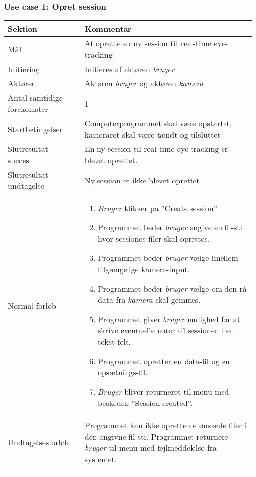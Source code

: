 \documentclass[kravspec.tex]{subfiles}
\begin{document}
		\subsubsection{Use case 1: Opret session}
		\begin{tabular}{|l|p{7.7cm}|}
			\hline \textbf{Sektion} & \textbf{Kommentar} \\ 
			\hline Mål & At oprette en ny session til real-time eye-tracking \\ 
			\hline Initiering & Initieres af aktøren \textit{bruger} \\ 
			\hline Aktører & Aktøren \textit{bruger} og aktøren \textit{kamera}\\ 
			\hline Antal samtidige forekomster & 1 \\ 
			\hline Startbetingelser & Computerprogrammet skal være opstartet, kameraret skal være tændt og tilsluttet \\ 	
			\hline Slutresultat - succes & En ny session til real-time eye-tracking er blevet oprettet. \\ 
			\hline Slutresultat - undtagelse &  Ny session er ikke blevet oprettet. \\ 
			\hline Normal forløb & \begin{enumerate}
				\item \textit{Bruger} klikker på ”Create session”
				\item Programmet beder \textit{bruger} angive en fil-sti hvor sessiones filer skal oprettes.
				\item Programmet beder \textit{bruger} vælge imellem tilgængelige kamera-input.
				\item Programmet beder \textit{bruger} vælge om den rå data fra \textit{kamera} skal gemmes.
				
				
				\item Programmet giver \textit{bruger} mulighed for at skrive eventuelle noter til sessionen i et tekst-felt. 
				\item Programmet opretter en data-fil og en opsætnings-fil.
				\item \textit{Bruger} bliver returneret til menu med beskeden ”Session created”.
				
			\end{enumerate} \\ 
			\hline Undtagelsesforløb & Programmet kan ikke oprette de ønskede filer i den angivne fil-sti. Programmet returnere \textit{bruger} til menu med fejlmeddelelse fra systemet.  \\ 
			\hline 
		\end{} \\ \\
		

\end{tabular}
\end{document}
